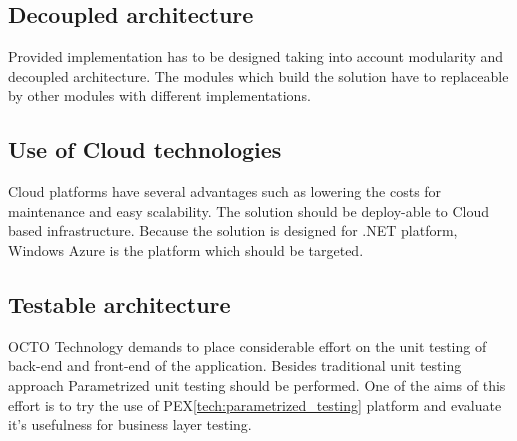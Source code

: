 \subsection{Decoupled architecture}
Provided implementation has to be designed taking into account modularity and decoupled architecture. The modules which build the solution have to replaceable by other modules with different implementations.

\subsection{Use of Cloud technologies}
Cloud platforms have several advantages such as lowering the costs for maintenance and easy scalability.
The solution should be deploy-able to Cloud based infrastructure. Because the solution is designed for .NET platform, Windows Azure is the platform which should be targeted.  

\subsection{Testable architecture}
OCTO Technology demands to place considerable effort on the unit testing of back-end and front-end of the application. Besides traditional unit testing approach Parametrized unit testing should be performed. One of the aims of this effort is to try the use of PEX\ref{tech:parametrized_testing} platform and evaluate it's usefulness for business layer testing.